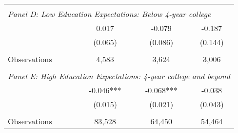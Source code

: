{\begin{tabular}{lccc}
&  &  &   \\
\multicolumn{4}{l}{\textit{Panel D: Low Education Expectations: Below 4-year college}} \\
\hspace{3mm}        &       0.017   &      -0.079   &      -0.187   \\
                    &     (0.065)   &     (0.086)   &     (0.144)   \\
                    &               &               &               \\
\hspace{3mm}Observations&       4,583   &       3,624   &       3,006   \\
 
&  &  &   \\
\multicolumn{4}{l}{\textit{Panel E: High Education Expectations: 4-year college and beyond}} \\
\hspace{3mm}        &      -0.046***&      -0.068***&      -0.038   \\
                    &     (0.015)   &     (0.021)   &     (0.043)   \\
                    &               &               &               \\
\hspace{3mm}Observations&      83,528   &      64,450   &      54,464   \\
 

\bottomrule
\end{tabular}
}
